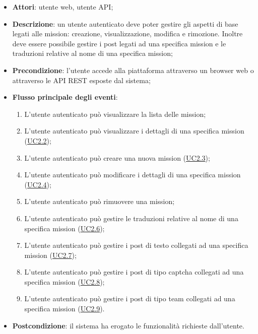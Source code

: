 \begin{itemize}
\item \textbf{Attori}: utente web, utente API;
\item \textbf{Descrizione}: un utente autenticato deve poter gestire gli aspetti di base legati alle mission: creazione, visualizzazione, modifica e rimozione.
Inoltre deve essere possibile gestire i post legati ad una specifica mission e le traduzioni relative al nome di una specifica mission; 
      \item \textbf{Precondizione}: l'utente accede alla piattaforma attraverso un browser web o attraverso le API REST esposte dal sistema;

        \item \textbf{Flusso principale degli eventi}:
          \begin{enumerate}
          \item L'utente autenticato può visualizzare la lista delle mission;
          \item L'utente autenticato può visualizzare i dettagli di una specifica mission (\hyperlink{UC2.2}{UC2.2});
          \item L'utente autenticato può creare una nuova mission (\hyperlink{UC2.3}{UC2.3});
          \item L'utente autenticato può modificare i dettagli di una specifica mission (\hyperlink{UC2.4}{UC2.4});
          \item L'utente autenticato può rimuovere una mission;
          \item L'utente autenticato può gestire le traduzioni relative al nome di una specifica mission (\hyperlink{UC2.6}{UC2.6});
          \item L'utente autenticato può gestire i post di testo collegati ad una specifica mission (\hyperlink{UC2.7}{UC2.7});
          \item L'utente autenticato può gestire i post di tipo captcha collegati ad una specifica mission (\hyperlink{UC2.8}{UC2.8});
          \item L'utente autenticato può gestire i post di tipo team collegati ad una specifica mission (\hyperlink{UC2.9}{UC2.9}).

      \end{enumerate}
    \item \textbf{Postcondizione}: il sistema ha erogato le funzionalità richieste dall'utente.
  \end{itemize}
\hypertarget{UC2.2}{}

